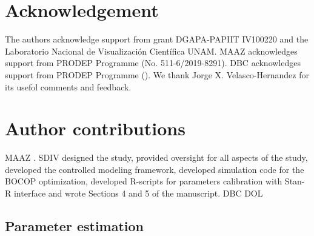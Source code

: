 \documentclass[3p, sort&compress]{elsarticle}
\begin{document}
    \section*{Acknowledgement}
    The authors acknowledge support
    from grant DGAPA-PAPIIT IV100220
    and the Laboratorio Nacional de
    Visualización Científica UNAM.
    MAAZ acknowledges support from
    PRODEP Programme (No.
    511-6/2019-8291). DBC
    acknowledges support from PRODEP
    Programme (). We thank Jorge
    X. Velasco-Hernandez for its usefol comments and feedback.
    \section*{Author contributions}
    MAAZ .
    SDIV designed the study, provided oversight for all
    aspects of the study, developed the controlled modeling
    framework, developed simulation code for the BOCOP optimization,
    developed R-scripts for parameters calibration with Stan-R interface and
    wrote
    Sections 4 and 5 of the manuscript.
    DBC
    DOL
    
    
    \begin{appendices}
        \section{Parameter estimation}
        
    \end{appendices}
\end{document}
